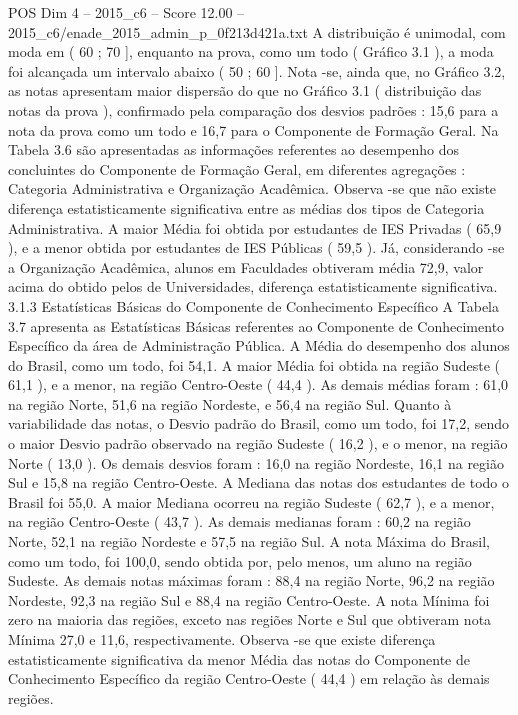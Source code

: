 \begin{textsample}{POS Dim 4 – 2015\_c6 – Score 12.00 – 2015\_c6/enade\_2015\_admin\_p\_0f213d421a.txt}
A distribuição é unimodal, com moda em ( 60 ; 70 ], enquanto na prova, como um todo ( Gráfico 3.1 ), a moda foi alcançada um intervalo abaixo ( 50 ; 60 ].
Nota -se, ainda que, no Gráfico 3.2, as notas apresentam maior dispersão do que no Gráfico 3.1 ( distribuição das notas da prova ), confirmado pela comparação dos desvios padrões : 15,6 para a nota da prova como um todo e 16,7 para o Componente de Formação Geral.
Na Tabela 3.6 são apresentadas as informações referentes ao desempenho dos concluintes do Componente de Formação Geral, em diferentes agregações : Categoria Administrativa e Organização Acadêmica.
Observa -se que não existe diferença estatisticamente significativa entre as médias dos tipos de Categoria Administrativa.
A maior Média foi obtida por estudantes de IES Privadas ( 65,9 ), e a menor obtida por estudantes de IES Públicas ( 59,5 ).
Já, considerando -se a Organização Acadêmica, alunos em Faculdades obtiveram média 72,9, valor acima do obtido pelos de Universidades, diferença estatisticamente significativa. 3.1.3 Estatísticas Básicas do Componente de Conhecimento Específico A Tabela 3.7 apresenta as Estatísticas Básicas referentes ao Componente de Conhecimento Específico da área de Administração Pública.
A Média do desempenho dos alunos do Brasil, como um todo, foi 54,1.
A maior Média foi obtida na região Sudeste ( 61,1 ), e a menor, na região Centro-Oeste ( 44,4 ).
As demais médias foram : 61,0 na região Norte, 51,6 na região Nordeste, e 56,4 na região Sul.
Quanto à variabilidade das notas, o Desvio padrão do Brasil, como um todo, foi 17,2, sendo o maior Desvio padrão observado na região Sudeste ( 16,2 ), e o menor, na região Norte ( 13,0 ).
Os demais desvios foram : 16,0 na região Nordeste, 16,1 na região Sul e 15,8 na região Centro-Oeste.
A Mediana das notas dos estudantes de todo o Brasil foi 55,0.
A maior Mediana ocorreu na região Sudeste ( 62,7 ), e a menor, na região Centro-Oeste ( 43,7 ).
As demais medianas foram : 60,2 na região Norte, 52,1 na região Nordeste e 57,5 na região Sul.
A nota Máxima do Brasil, como um todo, foi 100,0, sendo obtida por, pelo menos, um aluno na região Sudeste.
As demais notas máximas foram : 88,4 na região Norte, 96,2 na região Nordeste, 92,3 na região Sul e 88,4 na região Centro-Oeste.
A nota Mínima foi zero na maioria das regiões, exceto nas regiões Norte e Sul que obtiveram nota Mínima 27,0 e 11,6, respectivamente.
Observa -se que existe diferença estatisticamente significativa da menor Média das notas do Componente de Conhecimento Específico da região Centro-Oeste ( 44,4 ) em relação às demais regiões.

\end{textsample}
